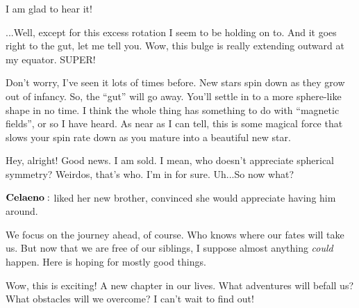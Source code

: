 \documentclass[main.tex]{subfiles}
\begin{document}
\Celaeno I am glad to hear it!

\Lacedaemon ...Well, except for this excess rotation I seem to be holding on to. And it goes right to the gut, let me tell you.  Wow, this bulge is really extending outward at my equator.  SUPER!  

\Celaeno Don't worry, I've seen it lots of times before.  New stars spin down as they grow out of infancy.  So, the ``gut'' will go away.  You'll settle in to a more sphere-like shape in no time.  I think the whole thing has something to do with ``magnetic fields'', or so I have heard.  As near as I can tell, this is some magical force that slows your spin rate down as you mature into a beautiful new star.

\Lacedaemon Hey, alright!  Good news.  I am sold.  I mean, who doesn't appreciate spherical symmetry?  Weirdos, that's who.  I'm in for sure.  Uh...So now what?

$\Celaeno$ liked her new brother, convinced she would appreciate having him around.

\Celaeno We focus on the journey ahead, of course.  Who knows where our fates will take us.  But now that we are free of our siblings, I suppose almost anything \textit{could} happen.  Here is hoping for mostly good things.

\Lacedaemon  Wow, this is exciting!  A new chapter in our lives.  What adventures will befall us?  What obstacles will we overcome?  I can't wait to find out!
\end{document}
